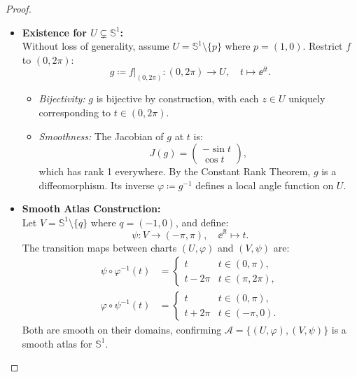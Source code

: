 \begin{problem}
\begin{proof}
\begin{itemize}
        \item \textbf{Existence for $U \subsetneq \mathbb{S}^1$:} \\
        Without loss of generality, assume $U = \mathbb{S}^1 \setminus \{p\}$ where $p = (1,0)$. Restrict $f$ to $(0, 2\pi)$:
        $$
        g \coloneqq f|_{(0, 2\pi)} \colon (0, 2\pi) \to U, \quad t \mapsto \ee^{\ii t}.
        $$
        \begin{itemize}
            \item \textit{Bijectivity:} $g$ is bijective by construction, with each $z \in U$ uniquely corresponding to $t \in (0, 2\pi)$.
            \item \textit{Smoothness:} The Jacobian of $g$ at $t$ is:
            $$
            J(g) = \begin{pmatrix} -\sin t \\ \cos t \end{pmatrix},           
            $$
            which has rank 1 everywhere. By the Constant Rank Theorem, $g$ is a diffeomorphism. Its inverse $\varphi \coloneqq g^{-1}$ defines a local angle function on $U$.
        \end{itemize}
        \item \textbf{Smooth Atlas Construction:} \\
        Let $V = \mathbb{S}^1 \setminus \{q\}$ where $q = (-1,0)$, and define:
        $$
        \psi \colon V \to (-\pi, \pi), \quad \ee^{\ii t} \mapsto t.
        $$
        The transition maps between charts $(U, \varphi)$ and $(V, \psi)$ are: 
        \begin{align*}
            \psi \circ \varphi^{-1}(t) &= 
            \begin{cases}
                t         & t \in (0, \pi), \\
                t - 2\pi  & t \in (\pi, 2\pi),
            \end{cases}
            \\
            \varphi \circ \psi^{-1}(t) &=             
            \begin{cases}
                t         & t \in (0, \pi), \\
                t + 2\pi  & t \in (-\pi, 0).
            \end{cases}
        \end{align*}
        Both are smooth on their domains, confirming $\mathcal{A} = \{(U, \varphi), (V, \psi)\}$ is a smooth atlas for $\mathbb{S}^1$.
    \end{itemize}
\end{proof}
\end{problem}

